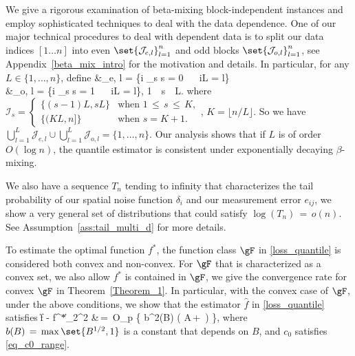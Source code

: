 \documentclass[twoside,11pt]{article}
\newcommand{\rev}[1]{{\color{revisionred}#1}}
\begin{document}
We give a rigorous examination
of beta-mixing block-independent instances and employ sophisticated techniques to deal with the data dependence. 
One of our major technical procedures to deal with dependent data is to split our data indices $[1\dots n]$ into even $\set{\mathcal{J}_{e,l}}_{l=1}^n$ and odd blocks $\set{\mathcal{J}_{o,l}}_{l=1}^n$, see Appendix~\ref{beta_mix_intro} for the motivation and details. 
\rev{In particular, for any \(L \in \{1, \ldots, n\}\), define}
\beq
\label{odd_even_indices}
&_{e, l} = \{i \in {}_s  s = 0 \,\,\,\,\,\, i\mod L = l\} \,\,\,\,\,\, \\ 
&_{o, l} = \{i \in {}_s  s = 1 \,\,\,\,\,\, i\mod L = l\}, 1 \,\leq\, s \,\leq\, L. 
\beq 
where $
\mathcal{I}_s = 
\begin{cases}
\{ (s - 1)L, sL \} & \text{when } 1 \,\leq\, s \,\leq\, K, \\
\{ (KL, n] \} & \text{when } s = K + 1. \end{cases}
$, \(K = \lfloor n/L \rfloor\). So we have  
$\bigcup_{l=1}^L \mathcal{J}_{e,l} \cup \bigcup_{l=1}^L \mathcal{J}_{o,l} = \{1, \ldots, n\}.$ \rev{Our analysis shows that if $L$ is of order $O(\log n)$, the quantile estimator is consistent under exponentially decaying $\beta$-mixing.}

We also have a sequence $T_n$ tending to infinity that characterizes the tail probability of our spatial noise function $\delta_i$ and our measurement error $e_{ij}$, we show a very general set of distributions that could satisfy $\log(T_n) \,=\, o(n)$. See Assumption~\ref{ass:tail_multi_d} for more details. 

To estimate the optimal function $f^*$, the function class $\gF$ in \eqref{loss_quantile} is considered both convex and non-convex. 
For $\gF$ that is characterized as a convex set, we also allow $f^*$ is contained in $\gF$, 
we give the convergence rate for convex $\gF$ in Theorem~\ref{Theorem_1}. In particular, with the convex case of $\gF$, under the above conditions, we show that the estimator $\hat{f}$ in \eqref{loss_quantile} satisfies 
\bea 
\left\|\hat f - f^*\right\|_2^2 &\,=\, O_p \left\{ b^2(B) \left( A\,+\, \right) \right\},
\bea where $b(B) \,=\, \max\set{B^{1/2},1}$ is a constant that depends on $B$, and $c_0$ satisfies \eqref{eq_c0_range}. 
 
\end{document}
